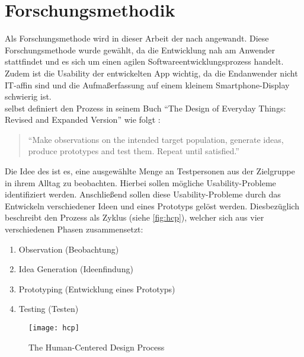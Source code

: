 \chapter{Forschungsmethodik}
Als Forschungsmethode wird in dieser Arbeit der \hcdp{} nach \citeauthor{Norman13} angewandt.
Diese Forschungsmethode wurde gewählt, da die Entwicklung nah am Anwender stattfindet und es sich um einen agilen Softwareentwicklungsprozess handelt.
Zudem ist die Usability der entwickelten App wichtig, da die Endanwender nicht IT-affin sind und die Aufmaßerfassung auf einem kleinem Smartphone-Display schwierig ist. \\

\noindent
\citeauthor{Norman13} selbst definiert den Prozess in seinem Buch ``The Design of Everyday Things: Revised and Expanded Version'' wie folgt \citep[Abbildung 6.2]{Norman13}:

\begin{quote}
	``Make observations on the intended target population, generate ideas, produce prototypes and test them.
	Repeat until satisfied.''
\end{quote}

\noindent
Die Idee des \hcdp{} ist es, eine ausgewählte Menge an Testpersonen aus der Zielgruppe in ihrem Alltag zu beobachten.
Hierbei sollen mögliche Usability-Probleme identifiziert werden.
Anschließend sollen diese Usability-Probleme durch das Entwickeln verschiedener Ideen und eines Prototyps gelöst werden.
Diesbezüglich beschreibt \citeauthor{Norman13} den Prozess als Zyklus (siehe \autoref{fig:hcp}), welcher sich aus vier verschiedenen Phasen zusammensetzt:

\begin{enumerate}
	\item Observation (Beobachtung) \label{itm:observation}
	\item Idea Generation (Ideenfindung) \label{itm:idea}
	\item Prototyping (Entwicklung eines Prototyps) \label{itm:prototyping}
	\item Testing (Testen) \label{itm:testing}
\end{enumerate}

\begin{figure}[h]
	\centering
	\texttt{[image: hcp]}
	\caption{The Human-Centered Design Process}
	\label{fig:hcp}
\end{figure}


